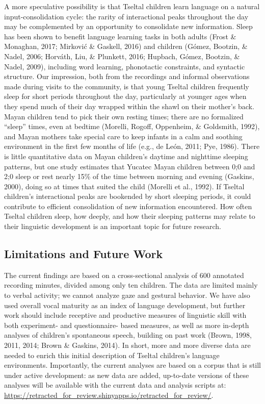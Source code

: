 \documentclass[floatsintext,man]{apa6}
\theoremstyle{definition}
\theoremstyle{definition}
\theoremstyle{definition}
\theoremstyle{remark}
\begin{document}
A more speculative possibility is that Tseltal children learn language
on a natural input-consolidation cycle: the rarity of interactional
peaks throughout the day may be complemented by an opportunity to
consolidate new information. Sleep has been shown to benefit language
learning tasks in both adults (Frost \& Monaghan, 2017; Mirković \&
Gaskell, 2016) and children (Gómez, Bootzin, \& Nadel, 2006; Horváth,
Liu, \& Plunkett, 2016; Hupbach, Gómez, Bootzin, \& Nadel, 2009),
including word learning, phonotactic constraints, and syntactic
structure. Our impression, both from the recordings and informal
observations made during visits to the community, is that young Tseltal
children frequently sleep for short periods throughout the day,
particularly at younger ages when they spend much of their day wrapped
within the shawl on their mother's back. Mayan children tend to pick
their own resting times; there are no formalized \enquote{sleep} times,
even at bedtime (Morelli, Rogoff, Oppenheim, \& Goldsmith, 1992), and
Mayan mothers take special care to keep infants in a calm and soothing
environment in the first few months of life (e.g., de León, 2011; Pye,
1986). There is little quantitative data on Mayan children's daytime and
nighttime sleeping patterns, but one study estimates that Yucatec Mayan
children between 0;0 and 2;0 sleep or rest nearly 15\% of the time
between morning and evening (Gaskins, 2000), doing so at times that
suited the child (Morelli et al., 1992). If Tseltal children's
interactional peaks are bookended by short sleeping periods, it could
contribute to efficient consolidation of new information encountered.
How often Tseltal children sleep, how deeply, and how their sleeping
patterns may relate to their linguistic development is an important
topic for future research.

\subsection{Limitations and Future Work}\label{disc-limfut}

The current findings are based on a cross-sectional analysis of 600
annotated recording minutes, divided among only ten children. The data
are limited mainly to verbal activity; we cannot analyze gaze and
gestural behavior. We have also used overall vocal maturity as an index
of language development, but further work should include receptive and
productive measures of linguistic skill with both experiment- and
questionnaire- based measures, as well as more in-depth analyses of
children's spontaneous speech, building on past work (Brown, 1998, 2011,
2014; Brown \& Gaskins, 2014). In short, more and more diverse data are
needed to enrich this initial description of Tseltal children's language
environments. Importantly, the current analyses are based on a corpus
that is still under active development: as new data are added,
up-to-date versions of these analyses will be available with the current
data and analysis scripts at:
\url{https://retracted_for_review.shinyapps.io/retracted_for_review/}.
\end{document}
